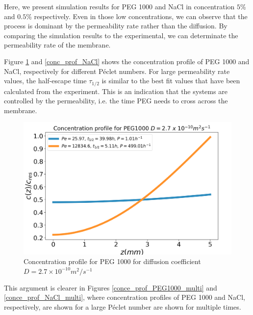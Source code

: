 \documentclass[11ptm,oneside,a4paper]{report}
\begin{document}
    Here, we present simulation results for PEG 1000 and NaCl in concentration 
    $5$\% and $0.5$\% respectively. Even in those low concentrations, we can observe that the process is dominant by the permeability rate rather than the diffusion.  
    By comparing the simulation results to the experimental, we can determinate the permeability rate of the membrane.  


    Figure \ref{conc_prof_PEG1000} and \ref{conc_prof_NaCl} shows the concentration profile of PEG 1000 and NaCl, respectively for 
    different P\'{e}clet numbers. For large permeability rate values, the half-escape time $\tau_{1/2}$ is similar to the best fit values that have been calculated from the experiment. This is an indication that the systems are controlled by the permeability, i.e. the time PEG needs to cross across the membrane. 
    \begin{figure}[!htb]
      \begin{center}
          \includegraphics[scale=0.25]{figures/conc_prof_diff_PEG1000_new_2.png}
          \caption{Concentration profile for PEG 1000 for diffusion coefficient 
          $D = 2.7 \times 10^{-10} m^2/s^{-1}$ \label{conc_prof_PEG1000}}
      \end{center} 
    \end{figure}
    \noindent 
    This argument is clearer in Figures \ref{conce_prof_PEG1000_multi} and \ref{conce_prof_NaCl_multi}, where concentration profiles of PEG 1000 and NaCl, respectively, are shown for a large P\'eclet number are shown for 
    multiple times. 
\end{document}
